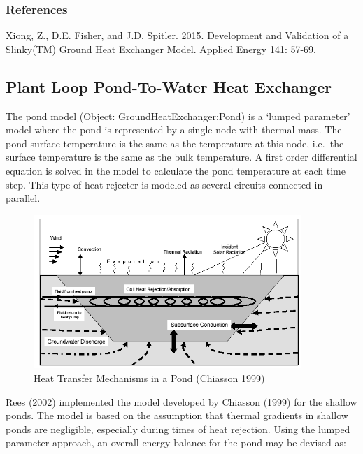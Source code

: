 \subsubsection{References}\label{references-3-003}

Xiong, Z., D.E. Fisher, and J.D. Spitler. 2015. Development and Validation of a Slinky(TM) Ground Heat Exchanger Model. Applied Energy 141: 57-69.

\subsection{Plant Loop Pond-To-Water Heat Exchanger}\label{plant-loop-pond-to-water-heat-exchanger}

The pond model (Object: GroundHeatExchanger:Pond) is a `lumped parameter' model where the pond is represented by a single node with thermal mass. The pond surface temperature is the same as the temperature at this node, i.e.~the surface temperature is the same as the bulk temperature. A first order differential equation is solved in the model to calculate the pond temperature at each time step. This type of heat rejecter is modeled as several circuits connected in parallel.

\begin{figure}[hbtp] %
\centering
\includegraphics[width=0.9\textwidth, height=0.9\textheight, keepaspectratio=true]{media/image5676.png}
\caption{Heat Transfer Mechanisms in a Pond (Chiasson 1999) \protect \label{fig:heat-transfer-mechanisms-in-a-pond-chiasson}}
\end{figure}

Rees (2002) implemented the model developed by Chiasson (1999) for the shallow ponds. The model is based on the assumption that thermal gradients in shallow ponds are negligible, especially during times of heat rejection. Using the lumped parameter approach, an overall energy balance for the pond may be devised as:

